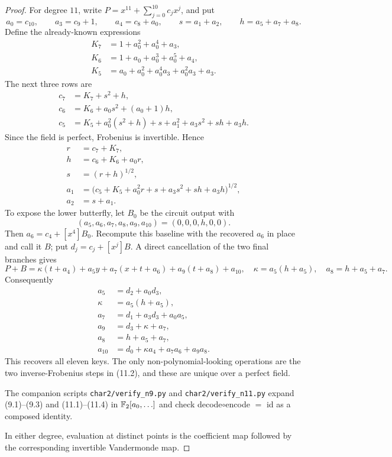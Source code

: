 \begin{proof}
For degree $11$, write
\(P=x^{11}+\sum_{j=0}^{10}c_jx^j\), and put
\[
 a_0=c_{10},\qquad a_3=c_9+1,\qquad a_4=c_8+a_0,
 \qquad s=a_1+a_2,\qquad h=a_5+a_7+a_8.
\]
Define the already-known expressions
\[
\begin{aligned}
 K_7&=1+a_0^2+a_0^4+a_3,\\
 K_6&=1+a_0+a_0^3+a_0^5+a_4,\\
 K_5&=a_0+a_0^2+a_0^4a_3+a_0^2a_3+a_3.
\end{aligned}
\]
The next three rows are
\[
\begin{aligned}
 c_7&=K_7+s^2+h,\\
 c_6&=K_6+a_0s^2+(a_0+1)h,\\
 c_5&=K_5+a_0^2(s^2+h)+s+a_1^2+a_3s^2+sh+a_3h.
\end{aligned}                                                    \tag{11.1}
\]
Since the field is perfect, Frobenius is invertible.  Hence
\[
\begin{aligned}
 r&=c_7+K_7,\\
 h&=c_6+K_6+a_0r,\\
 s&=(r+h)^{1/2},\\
 a_1&=\bigl(c_5+K_5+a_0^2r+s+a_3s^2+sh+a_3h\bigr)^{1/2},\\
 a_2&=s+a_1.
\end{aligned}                                                    \tag{11.2}
\]
To expose the lower butterfly, let $B_0$ be the circuit output with
\[
 (a_5,a_6,a_7,a_8,a_9,a_{10})=(0,0,0,h,0,0).
\]
Then $a_6=c_4+[x^4]B_0$.  Recompute this baseline with the recovered $a_6$
in place and call it $B$; put $d_j=c_j+[x^j]B$.  A direct cancellation of
the two final branches gives
\[
 P+B=\kappa(t+a_4)+a_5y+a_7(x+t+a_6)+a_9(t+a_8)+a_{10},
 \quad
 \kappa=a_5(h+a_5),\quad a_8=h+a_5+a_7.              \tag{11.3}
\]
Consequently
\[
\begin{aligned}
 a_5&=d_2+a_0d_3,\\
 \kappa&=a_5(h+a_5),\\
 a_7&=d_1+a_3d_3+a_0a_5,\\
 a_9&=d_3+\kappa+a_7,\\
 a_8&=h+a_5+a_7,\\
 a_{10}&=d_0+\kappa a_4+a_7a_6+a_9a_8.
\end{aligned}                                                    \tag{11.4}
\]
This recovers all eleven keys.  The only non-polynomial-looking operations are
the two inverse-Frobenius steps in (11.2), and these are unique over a perfect
field.

The companion scripts \texttt{char2/verify\_n9.py} and
\texttt{char2/verify\_n11.py} expand (9.1)--(9.3) and (11.1)--(11.4) in
$\mathbb{F}_2[a_0,\ldots]$ and check decode$\circ$encode $=$ id as a composed identity.

In either degree, evaluation at distinct points is the coefficient map followed
by the corresponding invertible Vandermonde map.
\end{proof}

